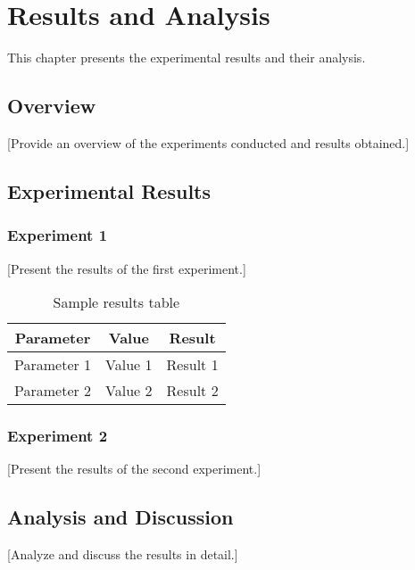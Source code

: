 \chapter{Results and Analysis}
\label{ch:results}

This chapter presents the experimental results and their analysis.

\section{Overview}
\label{sec:results-overview}

[Provide an overview of the experiments conducted and results obtained.]

\section{Experimental Results}
\label{sec:experimental-results}

\subsection{Experiment 1}
\label{subsec:experiment1}

[Present the results of the first experiment.]

\begin{table}[h]
\centering
\begin{tabular}{|c|c|c|}
\hline
\textbf{Parameter} & \textbf{Value} & \textbf{Result} \\
\hline
Parameter 1 & Value 1 & Result 1 \\
Parameter 2 & Value 2 & Result 2 \\
\hline
\end{tabular}
\caption{Sample results table}
\label{tab:results1}
\end{table}

\subsection{Experiment 2}
\label{subsec:experiment2}

[Present the results of the second experiment.]

\section{Analysis and Discussion}
\label{sec:analysis}

[Analyze and discuss the results in detail.]

